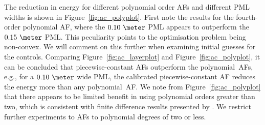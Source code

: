 \documentclass[a4paper]{article}
\begin{document}
The reduction in energy for different polynomial order AFs and
different PML widths is shown in Figure~\ref{fig:ac_polyplot}.  First
note the results for the fourth-order polynomial AF, where the
$0.10~\meter$ PML appears to outperform the $0.15~\meter$ PML. This
peculiarity points to the optimisation problem being non-convex. We
will comment on this further when examining initial guesses for the
controls.  Comparing Figure~\ref{fig:ac_layerplot} and
Figure~\ref{fig:ac_polyplot}, it can be concluded that
piecewise-constant AFs outperform the polynomial~AFs, e.g., for a
$0.10~\meter$ wide PML, the calibrated piecewise-constant AF reduces
the energy more than any polynomial~AF. We note from
Figure~\ref{fig:ac_polyplot} that there appears to be limited benefit
in using polynomial orders greater than two, which is consistent with
finite difference results presented by \citet{chew96jin}. We restrict
further experiments to AFs to polynomial degrees of two or less.
\end{document}
